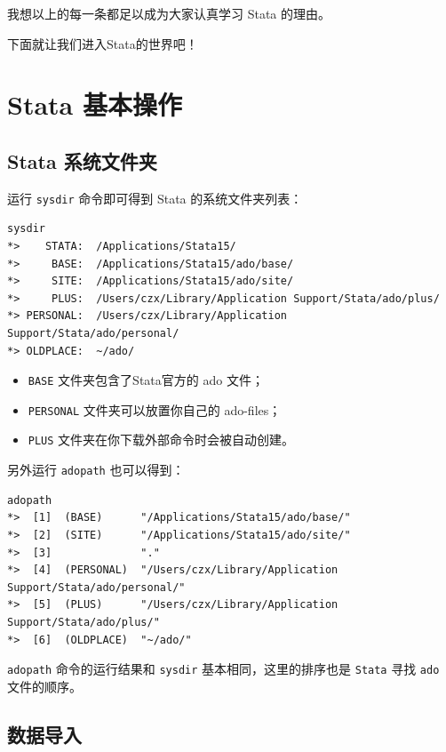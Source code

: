 \documentclass[]{ctexbook}
\providecommand{\tightlist}{%
  \setlength{\itemsep}{0pt}\setlength{\parskip}{0pt}}
\begin{document}
我想以上的每一条都足以成为大家认真学习 Stata 的理由。

下面就让我们进入Stata的世界吧！

\hypertarget{stata--4}{%
\section{Stata 基本操作}\label{stata--4}}

\hypertarget{stata--5}{%
\subsection{Stata 系统文件夹}\label{stata--5}}

运行 \texttt{sysdir} 命令即可得到 Stata 的系统文件夹列表：

\begin{lstlisting}
sysdir
*>    STATA:  /Applications/Stata15/
*>     BASE:  /Applications/Stata15/ado/base/
*>     SITE:  /Applications/Stata15/ado/site/
*>     PLUS:  /Users/czx/Library/Application Support/Stata/ado/plus/
*> PERSONAL:  /Users/czx/Library/Application Support/Stata/ado/personal/
*> OLDPLACE:  ~/ado/
\end{lstlisting}

\begin{itemize}
\tightlist
\item
  \texttt{BASE} 文件夹包含了Stata官方的 ado 文件；
\item
  \texttt{PERSONAL} 文件夹可以放置你自己的 ado-files；
\item
  \texttt{PLUS} 文件夹在你下载外部命令时会被自动创建。
\end{itemize}

另外运行 \texttt{adopath} 也可以得到：

\begin{lstlisting}
adopath
*>  [1]  (BASE)      "/Applications/Stata15/ado/base/"
*>  [2]  (SITE)      "/Applications/Stata15/ado/site/"
*>  [3]              "."
*>  [4]  (PERSONAL)  "/Users/czx/Library/Application Support/Stata/ado/personal/"
*>  [5]  (PLUS)      "/Users/czx/Library/Application Support/Stata/ado/plus/"
*>  [6]  (OLDPLACE)  "~/ado/"
\end{lstlisting}

\texttt{adopath} 命令的运行结果和 \texttt{sysdir} 基本相同，这里的排序也是 \texttt{Stata} 寻找 \texttt{ado} 文件的顺序。

\hypertarget{section-11}{%
\subsection{数据导入}\label{section-11}}
\end{document}

